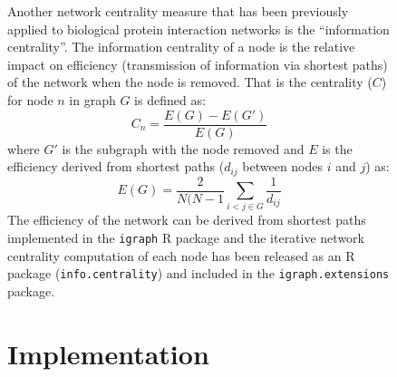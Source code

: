 \begin{figure}[!htp]
Another network centrality measure that has been previously applied to biological protein interaction networks \citep{Kranthi2013} is the ``information centrality''. The information centrality of a node is the relative impact on efficiency (transmission of information via shortest paths) of the network when the node is removed. That is the centrality ($C$) \citep{Kranthi2013} for node $n$ in graph $G$ is defined as: $$C_n = \frac{E(G)-E(G')}{E(G)}$$ where $G'$ is the subgraph with the node removed and $E$ is the efficiency \citep{Latora2001} derived from shortest paths ($d_{ij}$ between nodes $i$ and $j$) as: $$E(G) = \frac{2}{N(N-1} \sum_{i<j \in G}^{} \frac{1}{d_{ij}}$$ The efficiency of the network can be derived from shortest paths implemented in the \texttt{igraph} R package and the iterative network centrality computation of each node has been released as an R package (\texttt{info.centrality}) and included in the \texttt{igraph.extensions} package.

\section{Implementation}




\end{figure}
